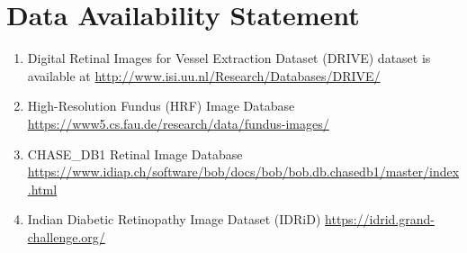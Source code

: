 \documentclass[utf8]{FrontiersinHarvard} %
\begin{document}
\section*{Data Availability Statement}
\begin{enumerate}
\item Digital Retinal Images for Vessel Extraction Dataset (DRIVE) dataset is available at \newline \url{http://www.isi.uu.nl/Research/Databases/DRIVE/}
\item High-Resolution Fundus (HRF) Image Database \newline \url{https://www5.cs.fau.de/research/data/fundus-images/}
\item CHASE\_DB1 Retinal Image Database \url{https://www.idiap.ch/software/bob/docs/bob/bob.db.chasedb1/master/index.html}
\item Indian Diabetic Retinopathy Image Dataset (IDRiD) \url{https://idrid.grand-challenge.org/}
\end{enumerate}







\end{document}
